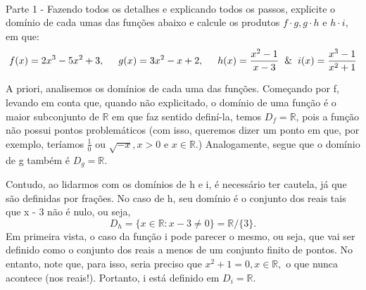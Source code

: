 \documentclass[Calculus1/exercícios_de_cálculo.tex]{subfiles}
\begin{document}
\paragraph{}Parte 1 - Fazendo todos os detalhes e explicando todos os passos, explicite o domínio de cada umas das funções abaixo e calcule os produtos $f\cdot{}g, g\cdot{}h \text{ e } h\cdot{}i$, em que:
$$
	f(x) = 2x^3 - 5x^2 + 3, \hspace{0.5cm}
	g(x) = 3x^2 - x + 2, \hspace{0.5cm}
	h(x) = \frac{x^2 - 1}{x - 3} \hspace{0.2cm} \text{\&} \hspace{0.2cm}
	i(x) = \frac{x^3 - 1}{x^2 + 1}
$$
\begin{sol*}
	A priori, analisemos os domínios de cada uma das funções. Começando por f, levando em conta que, quando não explicitado, o dom\'inio de uma função é o maior subconjunto de $\mathbb{R}$ em que faz sentido defin\'i-la, temos $D_f = \mathbb{R}$, pois a funç\~ao n\~ao possui pontos problemáticos (com isso, queremos dizer um ponto em que, por exemplo, ter\'iamos $\frac{1}{0}$ ou $\sqrt{-x}, x > 0$ e $x\in\mathbb{R}.$) Analogamente, segue que o dom\'inio de g também é $D_g = \mathbb{R}.$

	Contudo, ao lidarmos com os domínios de h e i, é necessário ter cautela, já que são definidas por frações. No caso de h, seu dom\'inio é o conjunto dos reais tais que x - 3 não é nulo, ou seja,
	$$
		D_h = \{x\in\mathbb{R}: x - 3 \neq 0\} = \mathbb{R}/\{3\}.
	$$
	Em primeira vista, o caso da função i pode parecer o mesmo, ou seja, que vai ser definido como o conjunto dos reais a menos de um conjunto finito de pontos. No entanto, note que, para isso, seria preciso que $x^2 + 1 = 0, x\in\mathbb{R},$ o que nunca acontece (nos reais!). Portanto, i está definido em $D_{i} = \mathbb{R}$.


\end{sol*}
\end{document}
